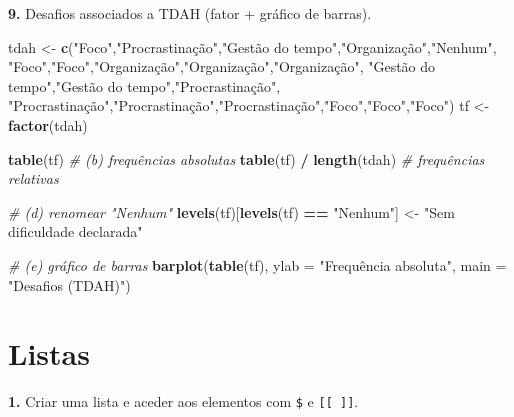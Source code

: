 \documentclass[
  portuguese,
  11pt,
  openany]{book}
\newenvironment{Shaded}{\begin{snugshade}}{\end{snugshade}}
\newcommand{\AttributeTok}[1]{\textcolor[rgb]{0.13,0.29,0.53}{#1}}
\newcommand{\CommentTok}[1]{\textcolor[rgb]{0.56,0.35,0.01}{\textit{#1}}}
\newcommand{\FunctionTok}[1]{\textcolor[rgb]{0.13,0.29,0.53}{\textbf{#1}}}
\newcommand{\NormalTok}[1]{#1}
\newcommand{\OtherTok}[1]{\textcolor[rgb]{0.56,0.35,0.01}{#1}}
\newcommand{\SpecialCharTok}[1]{\textcolor[rgb]{0.81,0.36,0.00}{\textbf{#1}}}
\newcommand{\StringTok}[1]{\textcolor[rgb]{0.31,0.60,0.02}{#1}}
\begin{document}
\textbf{9.} Desafios associados a TDAH (fator + gráfico de barras).

\begin{Shaded}
\begin{Highlighting}[]
\NormalTok{tdah }\OtherTok{\textless{}{-}} \FunctionTok{c}\NormalTok{(}\StringTok{"Foco"}\NormalTok{,}\StringTok{"Procrastinação"}\NormalTok{,}\StringTok{"Gestão do tempo"}\NormalTok{,}\StringTok{"Organização"}\NormalTok{,}\StringTok{"Nenhum"}\NormalTok{,}
          \StringTok{"Foco"}\NormalTok{,}\StringTok{"Foco"}\NormalTok{,}\StringTok{"Organização"}\NormalTok{,}\StringTok{"Organização"}\NormalTok{,}\StringTok{"Organização"}\NormalTok{,}
          \StringTok{"Gestão do tempo"}\NormalTok{,}\StringTok{"Gestão do tempo"}\NormalTok{,}\StringTok{"Procrastinação"}\NormalTok{,}
          \StringTok{"Procrastinação"}\NormalTok{,}\StringTok{"Procrastinação"}\NormalTok{,}\StringTok{"Procrastinação"}\NormalTok{,}\StringTok{"Foco"}\NormalTok{,}\StringTok{"Foco"}\NormalTok{,}\StringTok{"Foco"}\NormalTok{)}
\NormalTok{tf }\OtherTok{\textless{}{-}} \FunctionTok{factor}\NormalTok{(tdah)}

\FunctionTok{table}\NormalTok{(tf)                       }\CommentTok{\# (b) frequências absolutas}
\FunctionTok{table}\NormalTok{(tf) }\SpecialCharTok{/} \FunctionTok{length}\NormalTok{(tdah)        }\CommentTok{\#     frequências relativas}

\CommentTok{\# (d) renomear "Nenhum"}
\FunctionTok{levels}\NormalTok{(tf)[}\FunctionTok{levels}\NormalTok{(tf) }\SpecialCharTok{==} \StringTok{"Nenhum"}\NormalTok{] }\OtherTok{\textless{}{-}} \StringTok{"Sem dificuldade declarada"}

\CommentTok{\# (e) gráfico de barras}
\FunctionTok{barplot}\NormalTok{(}\FunctionTok{table}\NormalTok{(tf), }\AttributeTok{ylab =} \StringTok{"Frequência absoluta"}\NormalTok{, }\AttributeTok{main =} \StringTok{"Desafios (TDAH)"}\NormalTok{)}
\end{Highlighting}
\end{Shaded}

\section{Listas}\label{listas-1}

\textbf{1.} Criar uma lista e aceder aos elementos com \texttt{\$} e \texttt{{[}{[}\ {]}{]}}.
\end{document}
